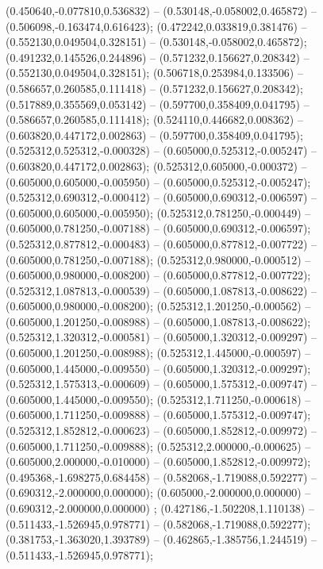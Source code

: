  (0.450640,-0.077810,0.536832) -- (0.530148,-0.058002,0.465872) -- (0.506098,-0.163474,0.616423);
 (0.472242,0.033819,0.381476) -- (0.552130,0.049504,0.328151) -- (0.530148,-0.058002,0.465872);
 (0.491232,0.145526,0.244896) -- (0.571232,0.156627,0.208342) -- (0.552130,0.049504,0.328151);
 (0.506718,0.253984,0.133506) -- (0.586657,0.260585,0.111418) -- (0.571232,0.156627,0.208342);
 (0.517889,0.355569,0.053142) -- (0.597700,0.358409,0.041795) -- (0.586657,0.260585,0.111418);
 (0.524110,0.446682,0.008362) -- (0.603820,0.447172,0.002863) -- (0.597700,0.358409,0.041795);
 (0.525312,0.525312,-0.000328) -- (0.605000,0.525312,-0.005247) -- (0.603820,0.447172,0.002863);
 (0.525312,0.605000,-0.000372) -- (0.605000,0.605000,-0.005950) -- (0.605000,0.525312,-0.005247);
 (0.525312,0.690312,-0.000412) -- (0.605000,0.690312,-0.006597) -- (0.605000,0.605000,-0.005950);
 (0.525312,0.781250,-0.000449) -- (0.605000,0.781250,-0.007188) -- (0.605000,0.690312,-0.006597);
 (0.525312,0.877812,-0.000483) -- (0.605000,0.877812,-0.007722) -- (0.605000,0.781250,-0.007188);
 (0.525312,0.980000,-0.000512) -- (0.605000,0.980000,-0.008200) -- (0.605000,0.877812,-0.007722);
 (0.525312,1.087813,-0.000539) -- (0.605000,1.087813,-0.008622) -- (0.605000,0.980000,-0.008200);
 (0.525312,1.201250,-0.000562) -- (0.605000,1.201250,-0.008988) -- (0.605000,1.087813,-0.008622);
 (0.525312,1.320312,-0.000581) -- (0.605000,1.320312,-0.009297) -- (0.605000,1.201250,-0.008988);
 (0.525312,1.445000,-0.000597) -- (0.605000,1.445000,-0.009550) -- (0.605000,1.320312,-0.009297);
 (0.525312,1.575313,-0.000609) -- (0.605000,1.575312,-0.009747) -- (0.605000,1.445000,-0.009550);
 (0.525312,1.711250,-0.000618) -- (0.605000,1.711250,-0.009888) -- (0.605000,1.575312,-0.009747);
 (0.525312,1.852812,-0.000623) -- (0.605000,1.852812,-0.009972) -- (0.605000,1.711250,-0.009888);
 (0.525312,2.000000,-0.000625) -- (0.605000,2.000000,-0.010000) -- (0.605000,1.852812,-0.009972);
 (0.495368,-1.698275,0.684458) -- (0.582068,-1.719088,0.592277) -- (0.690312,-2.000000,0.000000);
 (0.605000,-2.000000,0.000000) -- (0.690312,-2.000000,0.000000) ;
 (0.427186,-1.502208,1.110138) -- (0.511433,-1.526945,0.978771) -- (0.582068,-1.719088,0.592277);
 (0.381753,-1.363020,1.393789) -- (0.462865,-1.385756,1.244519) -- (0.511433,-1.526945,0.978771);
